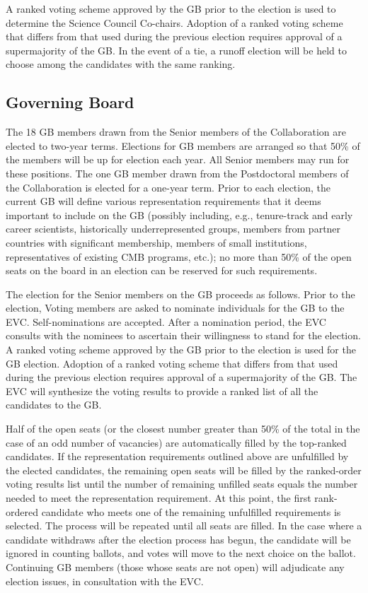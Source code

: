 \documentclass[12pt]{article}
\begin{document}
A ranked voting scheme approved by the GB prior to the election is used to determine the Science Council Co-chairs. Adoption of a ranked voting scheme that differs from that used during the previous election requires approval of a supermajority of the GB. In the event of a tie, a runoff election will be held to choose among the candidates with the same ranking.

\bigskip
\subsection{Governing Board}
\label{sec:gb-elections}

The 18 GB members drawn from the Senior members of the Collaboration are elected to two-year terms. Elections for GB members are arranged so that 50\% of the members will be up for election each year. All Senior members may run for these positions. The one GB member drawn from the Postdoctoral members of the Collaboration is elected for a one-year term. Prior to each election, the current GB will define various representation requirements that it deems important to include on the GB (possibly including, e.g., tenure-track and early career scientists,  historically underrepresented groups, members from partner countries with significant membership, members of small institutions, representatives of existing CMB programs, etc.); no more than 50\% of the open seats on the board in an election can be reserved for such requirements.

The election for the Senior members on the GB proceeds as follows. 
Prior to the election, Voting members are asked to nominate individuals for the GB to the EVC. Self-nominations are accepted. After a nomination period, the EVC consults with the nominees to ascertain their willingness to stand for the election. A ranked voting scheme approved by the GB prior to the election is used for the GB election. Adoption of a ranked voting scheme that differs from that used during the previous election requires approval of a supermajority of the GB. The EVC will synthesize the voting results to provide a ranked list of all the candidates to the GB. 

Half of the open seats (or the closest number greater than 50\% of the total in the case of an odd number of vacancies) are automatically filled by the top-ranked candidates. If the representation requirements outlined above are unfulfilled by the elected candidates, the remaining open seats will be filled by the ranked-order voting results list until the number of remaining unfilled seats equals the number needed to meet the representation requirement.  At this point, the first rank-ordered candidate who meets one of the remaining unfulfilled requirements is selected. The process will be repeated until all seats are filled. In the case where a candidate withdraws after the election process has begun, the candidate will be ignored in counting ballots, and votes will move to the next choice on the ballot. Continuing GB members (those whose seats are not open) will adjudicate any election issues, in consultation with the EVC.
\end{document}
